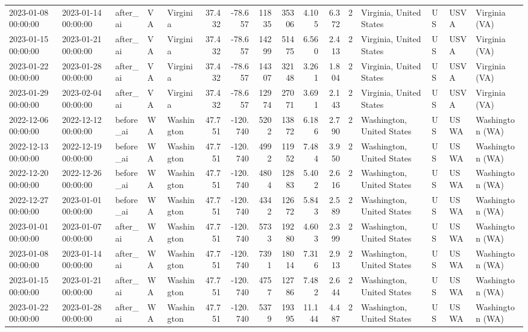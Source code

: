 \begin{tabular}{lllllrrrrrrlllll}
2023-01-08 00:00:00 & 2023-01-14 00:00:00 & after\_ai & VA & Virginia & 37.432 & -78.657 & 11835 & 35306 & 4.105 & 6.372 & 2 & Virginia, United States & US & USVA & Virginia (VA) \\
2023-01-15 00:00:00 & 2023-01-21 00:00:00 & after\_ai & VA & Virginia & 37.432 & -78.657 & 14299 & 51475 & 6.560 & 2.413 & 2 & Virginia, United States & US & USVA & Virginia (VA) \\
2023-01-22 00:00:00 & 2023-01-28 00:00:00 & after\_ai & VA & Virginia & 37.432 & -78.657 & 14307 & 32148 & 3.261 & 1.804 & 2 & Virginia, United States & US & USVA & Virginia (VA) \\
2023-01-29 00:00:00 & 2023-02-04 00:00:00 & after\_ai & VA & Virginia & 37.432 & -78.657 & 12974 & 27071 & 3.691 & 2.143 & 2 & Virginia, United States & US & USVA & Virginia (VA) \\
2022-12-06 00:00:00 & 2022-12-12 00:00:00 & before\_ai & WA & Washington & 47.751 & -120.740 & 5202 & 13872 & 6.186 & 2.790 & 2 & Washington, United States & US & USWA & Washington (WA) \\
2022-12-13 00:00:00 & 2022-12-19 00:00:00 & before\_ai & WA & Washington & 47.751 & -120.740 & 4992 & 11952 & 7.484 & 3.950 & 2 & Washington, United States & US & USWA & Washington (WA) \\
2022-12-20 00:00:00 & 2022-12-26 00:00:00 & before\_ai & WA & Washington & 47.751 & -120.740 & 4804 & 12883 & 5.402 & 2.616 & 2 & Washington, United States & US & USWA & Washington (WA) \\
2022-12-27 00:00:00 & 2023-01-01 00:00:00 & before\_ai & WA & Washington & 47.751 & -120.740 & 4342 & 12672 & 5.843 & 2.589 & 2 & Washington, United States & US & USWA & Washington (WA) \\
2023-01-01 00:00:00 & 2023-01-07 00:00:00 & after\_ai & WA & Washington & 47.751 & -120.740 & 5733 & 19280 & 4.603 & 2.399 & 2 & Washington, United States & US & USWA & Washington (WA) \\
2023-01-08 00:00:00 & 2023-01-14 00:00:00 & after\_ai & WA & Washington & 47.751 & -120.740 & 7391 & 18014 & 7.316 & 2.913 & 2 & Washington, United States & US & USWA & Washington (WA) \\
2023-01-15 00:00:00 & 2023-01-21 00:00:00 & after\_ai & WA & Washington & 47.751 & -120.740 & 4757 & 12786 & 7.482 & 2.644 & 2 & Washington, United States & US & USWA & Washington (WA) \\
2023-01-22 00:00:00 & 2023-01-28 00:00:00 & after\_ai & WA & Washington & 47.751 & -120.740 & 5379 & 19395 & 11.144 & 4.487 & 2 & Washington, United States & US & USWA & Washington (WA) \\

\end{tabular}
